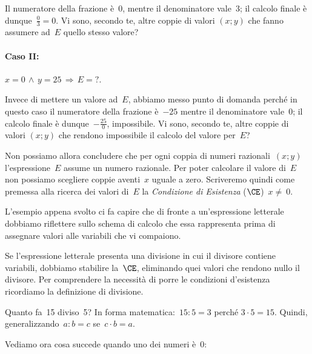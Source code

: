 Il numeratore della frazione è~0, mentre il denominatore vale~3; il
calcolo finale è dunque~$\frac{0}{3}=0$.
Vi sono, secondo te, altre coppie di valori $(x;y)$ che fanno
assumere ad~$E$ quello stesso valore?

\paragraph{Caso II:} $x=0\,\wedge\, y=25\, \Rightarrow\, E=?$.

Invece di mettere un valore ad~$E$, abbiamo messo punto di domanda
perché in questo caso il numeratore della frazione è~$-25$ mentre
il denominatore vale~0; il calcolo finale è dunque~$-{\frac{25}{0}}$, impossibile.
Vi sono, secondo te, altre coppie di valori $(x;y)$ che rendono
impossibile il calcolo del valore per~$E$?

Non possiamo allora concludere che per ogni coppia di numeri razionali~$(x;y)$ 
l'espressione~$E$ assume un numero razionale.
Per poter calcolare il valore di~$E$ non possiamo scegliere coppie aventi~$x$ 
uguale a zero.
Scriveremo quindi come premessa alla ricerca dei valori di~$E$ la \emph{Condizione di Esistenza} ($\CE$)~$x\neq~0$.

L'esempio appena svolto ci fa capire che di fronte a
un'espressione letterale dobbiamo riflettere sullo
schema di calcolo che essa rappresenta prima di assegnare valori alle
variabili che vi compaiono.

Se l'espressione letterale presenta una divisione in cui
il divisore contiene variabili, dobbiamo stabilire la~$\CE$, 
eliminando quei valori che rendono nullo il divisore.
Per comprendere la necessità di porre le condizioni
d'esistenza ricordiamo la definizione di divisione.

Quanto fa~15 diviso~5? In forma matematica:~$15:5=3$ perché $3\cdot 5=15$. Quindi, 
generalizzando~$a:b=c$ se~$c\cdot b=a$.

Vediamo ora cosa succede quando uno dei numeri è~0:

